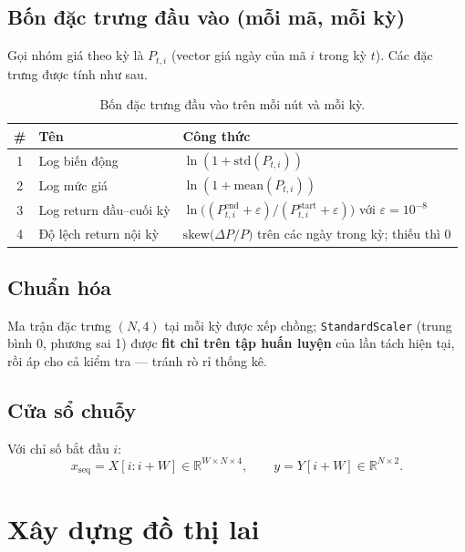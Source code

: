 \documentclass[12pt,a4paper]{article}
\begin{document}
\subsection{Bốn đặc trưng đầu vào (mỗi mã, mỗi kỳ)}
Gọi nhóm giá theo kỳ là $P_{t,i}$ (vector giá ngày của mã $i$ trong kỳ $t$). Các đặc trưng được tính như sau.

\begin{table}[H]
\centering
\begin{tabular}{@{}c L{3.2cm} L{6.8cm}@{}}
\toprule
\textbf{\#} & \textbf{Tên} & \textbf{Công thức} \\
 & Log biến động & $\ln(1 + \mathrm{std}(P_{t,i}))$ \\
2 & Log mức giá & $\ln(1 + \mathrm{mean}(P_{t,i}))$ \\
3 & Log return đầu--cuối kỳ & $\ln\!\big((P^{\mathrm{end}}_{t,i}+\varepsilon)/(P^{\mathrm{start}}_{t,i}+\varepsilon)\big)$ với $\varepsilon=10^{-8}$ \\
4 & Độ lệch return nội kỳ & $\mathrm{skew}\big(\Delta P/P\big)$ trên các ngày trong kỳ; thiếu thì 0 \\
\bottomrule
\end{tabular}
\caption{Bốn đặc trưng đầu vào trên mỗi nút và mỗi kỳ.}
\label{tab:features}
\end{table}

\subsection{Chuẩn hóa}
Ma trận đặc trưng $(N,4)$ tại mỗi kỳ được xếp chồng; \texttt{StandardScaler} (trung bình 0, phương sai 1) được \textbf{fit chỉ trên tập huấn luyện} của lần tách hiện tại, rồi áp cho cả kiểm tra --- tránh rò rỉ thống kê.

\subsection{Cửa sổ chuỗy}
Với chỉ số bắt đầu $i$:
\begin{equation}
  x_{\mathrm{seq}} = X[i:i+W] \in \mathbb{R}^{W \times N \times 4}, \qquad
  y = Y[i+W] \in \mathbb{R}^{N \times 2}.
\end{equation}

\section{Xây dựng đồ thị lai}
\end{document}
